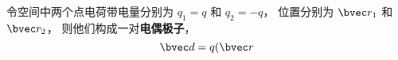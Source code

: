 


令空间中两个点电荷带电量分别为 $q_1 = q$ 和 $q_2 = -q$， 位置分别为 $\bvec r_1$ 和 $\bvec r_2$， 则他们构成一对\textbf{电偶极子}，
\begin{equation}
\bvec d = q (\bvec r
\end{equation}

